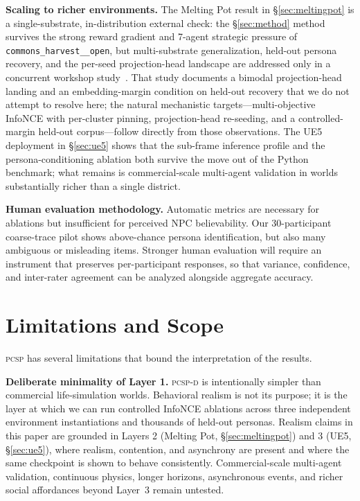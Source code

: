 \documentclass[conference]{IEEEtran}
\newcommand{\PCSP}{\textsc{pcsp}\xspace}
\newcommand{\PCSPD}{\textsc{pcsp-d}\xspace}
\begin{document}
\textbf{Scaling to richer environments.}
The Melting Pot result in \S\ref{sec:meltingpot} is a single-substrate,
in-distribution external check: the \S\ref{sec:method} method survives the
strong reward gradient and 7-agent strategic pressure of
\texttt{commons\_harvest\_\_open}, but multi-substrate generalization, held-out
persona recovery, and the per-seed projection-head landscape are addressed only
in a concurrent workshop study~\cite{phase5report}. That study documents a
bimodal projection-head landing and an embedding-margin condition on held-out
recovery that we do not attempt to resolve here; the natural mechanistic
targets---multi-objective InfoNCE with per-cluster pinning, projection-head
re-seeding, and a controlled-margin held-out corpus---follow directly from
those observations. The UE5 deployment in \S\ref{sec:ue5} shows that the
sub-frame inference profile and the persona-conditioning ablation both survive
the move out of the Python benchmark; what remains is commercial-scale
multi-agent validation in worlds substantially richer than a single district.

\textbf{Human evaluation methodology.}
Automatic metrics are necessary for ablations but insufficient for perceived NPC
believability. Our 30-participant coarse-trace pilot shows above-chance persona
identification, but also many ambiguous or misleading items. Stronger human
evaluation will require an instrument that preserves per-participant responses,
so that variance, confidence, and inter-rater agreement can be analyzed
alongside aggregate accuracy.

\section{Limitations and Scope}
\label{sec:limits}

\PCSP has several limitations that bound the interpretation of the results.

\textbf{Deliberate minimality of Layer 1.}
\PCSPD{} is intentionally simpler than commercial life-simulation worlds.
Behavioral realism is not its purpose; it is the layer at which we can run
controlled InfoNCE ablations across three independent environment
instantiations and thousands of held-out personas. Realism claims in this
paper are grounded in Layers 2 (Melting Pot, \S\ref{sec:meltingpot}) and 3
(UE5, \S\ref{sec:ue5}), where realism, contention, and asynchrony are present
and where the same checkpoint is shown to behave consistently. Commercial-scale
multi-agent validation, continuous physics, longer horizons, asynchronous
events, and richer social affordances beyond Layer~3 remain untested.
\end{document}
